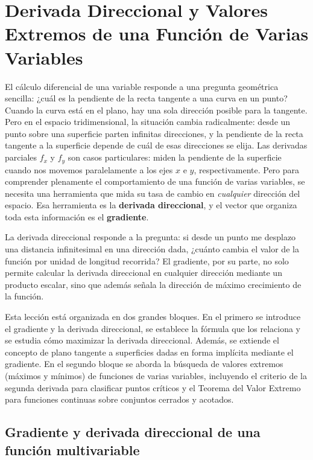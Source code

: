\chapter{Derivada Direccional y Valores Extremos de una Función de Varias Variables}

El cálculo diferencial de una variable responde a una pregunta geométrica
sencilla: ¿cuál es la pendiente de la recta tangente a una curva en un
punto? Cuando la curva está en el plano, hay una sola dirección posible
para la tangente. Pero en el espacio tridimensional, la situación cambia
radicalmente: desde un punto sobre una superficie parten infinitas
direcciones, y la pendiente de la recta tangente a la superficie depende
de cuál de esas direcciones se elija. Las derivadas parciales
$f_x$ y $f_y$ son casos particulares: miden la pendiente de la
superficie cuando nos movemos paralelamente a los ejes $x$ e $y$,
respectivamente. Pero para comprender plenamente el comportamiento de una
función de varias variables, se necesita una herramienta que mida su tasa
de cambio en \emph{cualquier} dirección del espacio. Esa herramienta es
la \textbf{derivada direccional}, y el vector que organiza toda esta
información es el \textbf{gradiente}.

La derivada direccional responde a la pregunta: si desde un punto me
desplazo una distancia infinitesimal en una dirección dada, ¿cuánto
cambia el valor de la función por unidad de longitud recorrida? El
gradiente, por su parte, no solo permite calcular la derivada direccional
en cualquier dirección mediante un producto escalar, sino que además
señala la dirección de máximo crecimiento de la función.

Esta lección está organizada en dos grandes bloques. En el primero se
introduce el gradiente y la derivada direccional, se establece la fórmula
que los relaciona y se estudia cómo maximizar la derivada direccional.
Además, se extiende el concepto de plano tangente a superficies dadas en
forma implícita mediante el gradiente. En el segundo bloque se aborda la
búsqueda de valores extremos (máximos y mínimos) de funciones de varias
variables, incluyendo el criterio de la segunda derivada para
clasificar puntos críticos y el Teorema del Valor Extremo para funciones
continuas sobre conjuntos cerrados y acotados.

\section{Gradiente y derivada direccional de una función multivariable}

